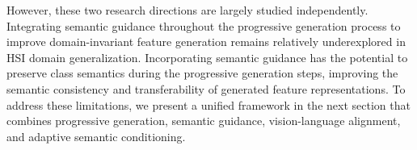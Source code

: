 However, these two research directions are largely studied independently. Integrating semantic guidance throughout the progressive generation process to improve domain-invariant feature generation remains relatively underexplored in HSI domain generalization. Incorporating semantic guidance has the potential to preserve class semantics during the progressive generation steps, improving the semantic consistency and transferability of generated feature representations. To address these limitations, we present a unified framework in the next section that combines progressive generation, semantic guidance, vision-language alignment, and adaptive semantic conditioning.
